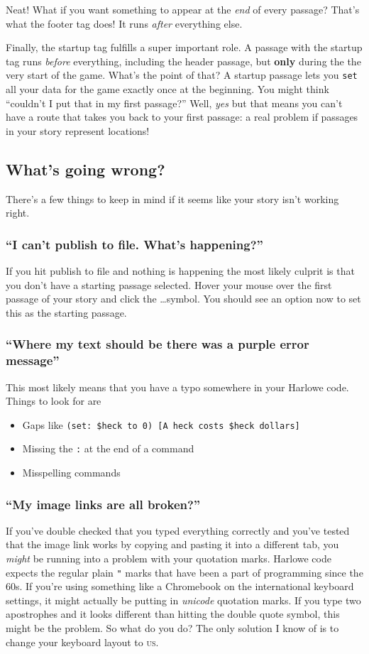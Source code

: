 \documentclass[a5paper,11pt]{article}
\begin{document}
Neat! What if you want something to appear at the \emph{end} of every passage? That's what the footer tag does! It runs \emph{after} everything else.

Finally, the startup tag fulfills a super important role. A passage with the startup tag runs \emph{before} everything, including the header passage, but \textbf{only} during the the very start of the game. What's the point of that? A startup passage lets you \verb|set| all your data for the game exactly once at the beginning. You might think ``couldn't I put that in my first passage?'' Well, \emph{yes} but that means you can't have a route that takes you back to your first passage: a real problem if passages in your story represent locations!

\subsection{What's going wrong?}
There's a few things to keep in mind if it seems like your story isn't working right.
\subsubsection{``I can't publish to file. What's happening?''}
If you hit publish to file and nothing is happening the most likely culprit is that you don't have a starting passage selected. Hover your mouse over the first passage of your story and click the \ldots symbol. You should see an option now to set this as the starting passage. 
\subsubsection{``Where my text should be there was a purple error message''}
This most likely means that you have a typo somewhere in your Harlowe code. Things to look for are
\begin{itemize}
 \item Gaps like \verb"(set: $heck to 0) [A heck costs $heck dollars]"
 \item Missing the \verb":" at the end of a command
 \item Misspelling commands
\end{itemize}
\subsubsection{``My image links are all broken?''}
If you've double checked that you typed everything correctly and you've tested that the image link works by copying and pasting it into a different tab, you \emph{might} be running into a problem with your quotation marks. Harlowe code expects the regular plain \verb|"| marks that have been a part of programming since the 60s. If you're using something like a Chromebook on the international keyboard settings, it might actually be putting in \emph{unicode} quotation marks. If you type two apostrophes and it looks different than hitting the double quote symbol, this might be the problem. So what do you do? The only solution I know of is to change your keyboard layout to \textsc{us}. 
\end{document}
